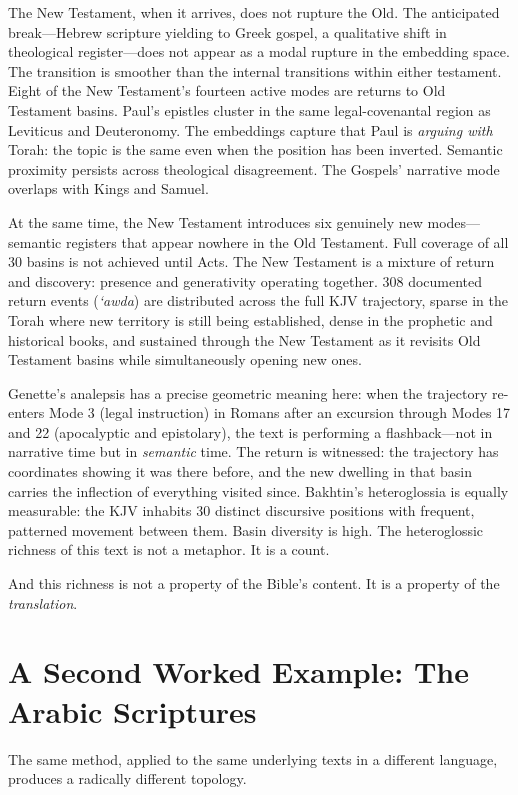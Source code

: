 The New Testament, when it arrives, does not rupture the Old. The anticipated break---Hebrew scripture yielding to Greek gospel, a qualitative shift in theological register---does not appear as a modal rupture in the embedding space. The transition is smoother than the internal transitions within either testament. Eight of the New Testament's fourteen active modes are returns to Old Testament basins. Paul's epistles cluster in the same legal-covenantal region as Leviticus and Deuteronomy. The embeddings capture that Paul is \emph{arguing with} Torah: the topic is the same even when the position has been inverted. Semantic proximity persists across theological disagreement. The Gospels' narrative mode overlaps with Kings and Samuel.

At the same time, the New Testament introduces six genuinely new modes---semantic registers that appear nowhere in the Old Testament. Full coverage of all 30 basins is not achieved until Acts. The New Testament is a mixture of return and discovery: presence and generativity operating together. 308 documented return events (\emph{`awda}) are distributed across the full KJV trajectory, sparse in the Torah where new territory is still being established, dense in the prophetic and historical books, and sustained through the New Testament as it revisits Old Testament basins while simultaneously opening new ones.

Genette's analepsis has a precise geometric meaning here: when the trajectory re-enters Mode 3 (legal instruction) in Romans after an excursion through Modes 17 and 22 (apocalyptic and epistolary), the text is performing a flashback---not in narrative time but in \emph{semantic} time. The return is witnessed: the trajectory has coordinates showing it was there before, and the new dwelling in that basin carries the inflection of everything visited since. Bakhtin's heteroglossia is equally measurable: the KJV inhabits 30 distinct discursive positions with frequent, patterned movement between them. Basin diversity is high. The heteroglossic richness of this text is not a metaphor. It is a count.

And this richness is not a property of the Bible's content. It is a property of the \emph{translation}.


\section{A Second Worked Example: The Arabic Scriptures}

The same method, applied to the same underlying texts in a different language, produces a radically different topology.

